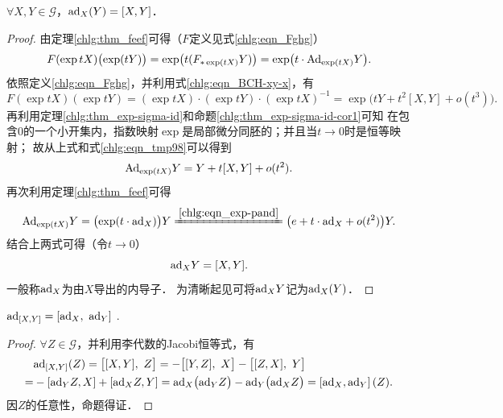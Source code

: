 \begin{theorem}\label{chlg:thm_adxy1}
    $\forall X,Y \in \mathscr{G}$，${\rm ad}_{X}(Y)=[X,Y]$．
\end{theorem}
\begin{proof}
    由定理\ref{chlg:thm_feef}可得（$F$定义见式\eqref{chlg:eqn_Fghg}）
    \begin{equation}\label{chlg:eqn_tmp98}
        F(\exp tX)\bigl(\exp (t Y)\bigr) = \exp \bigl(t (F_{*\exp (tX)} Y)\bigr)
        =\exp \bigl(t \cdot {\rm Ad}_{\exp (tX)} Y\bigr) .
    \end{equation}
    依照定义\eqref{chlg:eqn_Fghg}，并利用式\eqref{chlg:eqn_BCH-xy-x}，有
    \begin{equation*}
        F(\exp tX) (\exp tY) = (\exp tX)\cdot  (\exp tY) \cdot (\exp tX)^{-1}
        =\exp\bigl(tY+t^2[X,Y]+o(t^3)\bigr) .
    \end{equation*}
    再利用定理\ref{chlg:thm_exp-sigma-id}和命题\ref{chlg:thm_exp-sigma-id-cor1}可知
    在包含0的一个小开集内，指数映射$\exp$是局部微分同胚的；并且当$t\to 0$时是恒等映射；
    故从上式和式\eqref{chlg:eqn_tmp98}可以得到
    \begin{equation}
        {\rm Ad}_{\exp (tX)} Y = Y+t[X,Y]+o(t^2).
    \end{equation}
    再次利用定理\ref{chlg:thm_feef}可得
    \begin{equation}
        {\rm Ad}_{\exp (tX)} Y = \bigl(\exp (t\cdot {\rm ad}_X)\bigr) Y
        \xlongequal{\ref{chlg:eqn_exp-pand}}
        \bigl(e + t \cdot {\rm ad}_X + o(t^2)\bigr) Y .
    \end{equation}
    结合上两式可得（令$t\to 0$）
    \begin{equation}
        {\rm ad}_X  Y = [X,Y].
    \end{equation}
    一般称${\rm ad}_X $为由$X$导出的{\heiti 内导子}．
    为清晰起见可将${\rm ad}_X  Y$记为${\rm ad}_X  (Y)$．
\end{proof}

\begin{theorem}\label{chlg:thm_adxy2}
    ${\rm ad}_{[X,Y]} = \left[{\rm ad}_X,\  {\rm ad}_Y \right]$ .
\end{theorem}
\begin{proof}
    $\forall Z \in \mathscr{G}$，并利用李代数的Jacobi恒等式，有
    \begin{align*}
        &{\rm ad}_{[X,Y]}(Z) = \bigl[[X,Y],\ Z\bigr]
        = - \bigl[[Y,Z],\ X\bigr] - \bigl[[Z,X],\ Y\bigr] \\
        =& - \left[{\rm ad}_Y Z, X\right] + \left[{\rm ad}_X Z, Y\right] 
        = {\rm ad}_X\bigl( {\rm ad}_Y Z \bigr) - {\rm ad}_Y\bigl( {\rm ad}_X Z\bigr) 
        = \left[{\rm ad}_X,{\rm ad}_Y \right](Z) .
    \end{align*}
    因$Z$的任意性，命题得证．
\end{proof}


